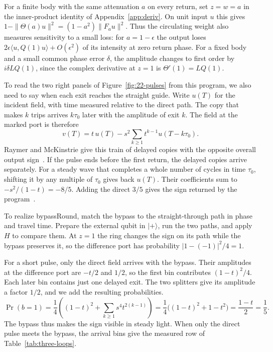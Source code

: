 \documentclass[acmsmall,screen,review,anonymous,nonacm]{acmart}
\newcommand{\storyinlineface}{\small\ttfamily}
\newcommand{\code}[1]{\textnormal{\storyinlineface #1}}
\newcommand{\ket}[1]{\lvert #1\rangle}
\numberwithin{equation}{section}
\begin{document}
For a finite body with the same attenuation $a$ on every return, set $z=w=a$ in the
inner-product identity of Appendix~\ref{app:deriv}. On unit input $u$ this gives
$1-\|\Theta(a)u\|^2=(1-a^2)\|F_a u\|^2$. Thus the circulating weight also measures
sensitivity to a small loss: for $a=1-\epsilon$ the output loses
$2\epsilon\langle u,Q(1)u\rangle+O(\epsilon^2)$ of its intensity at zero return phase.
For a fixed body and a small common phase error $\delta$, the amplitude changes to first order by $i\delta LQ(1)$, since the complex derivative at $z=1$ is $\Theta'(1)=LQ(1)$.

To read the two right panels of Figure~\ref{fig:22-pulses} from this program, we
also need to say when each exit reaches the straight guide.
Write $u(T)$ for the incident field, with time measured relative to the direct path. The copy that makes $k$ trips arrives $k\tau_0$ later with the
amplitude of exit $k$. The field at the marked port is therefore
\[
 v(T)=t\,u(T)-s^2\sum_{k\ge1}t^{k-1}u(T-k\tau_0).
\]
Raymer and McKinstrie give this train of delayed copies with the opposite
overall output sign~\cite[Eqs.~(30)--(33)]{RaymerMcKinstrie13Cavity}.
If the pulse ends before the first return, the delayed copies arrive separately.
For a steady wave that completes a whole number of cycles in time $\tau_0$,
shifting it by any multiple of $\tau_0$ gives back $u(T)$. Their coefficients sum to $-s^2/(1-t)=-8/5$.
Adding the direct $3/5$ gives the sign returned by the
program~\cite[Eqs.~(6)--(7)]{Alsing17RingLoss}.

To realize \code{bypassRound}, match the bypass to the straight-through
path in phase and travel time. Prepare the external qubit in $\ket+$, run the
two paths, and apply $H$ to compare them. At $z=1$ the ring changes the sign on its path while the bypass preserves it,
so the difference port has probability $|1-(-1)|^2/4=1$.

For a short pulse, only the direct field arrives with the bypass.
Their amplitudes at the difference port are $-t/2$ and $1/2$, so the
first bin contributes $(1-t)^2/4$. Each later bin contains just one
delayed exit. The two splitters give its amplitude a factor $1/2$,
and we add the resulting probabilities.
\[
 \Pr(b=1)=\frac14\left((1-t)^2+
                \sum_{k\ge1}s^4t^{2(k-1)}\right)
=\frac14\bigl((1-t)^2+1-t^2\bigr)=\frac{1-t}2=\frac15.
\]
The bypass thus makes the sign visible in steady light. When only the direct pulse meets the bypass, the arrival bins give the measured row of Table~\ref{tab:three-loops}.
\end{document}
